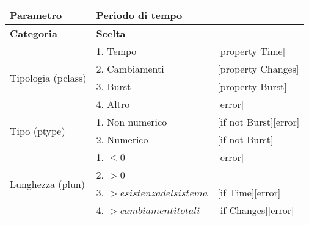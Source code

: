 \begin{table}[ht]
\begin{tabular}{|p{4cm}|p{4cm}p{5cm}|}
				
				\cellcolor{Gray} \textbf{Parametro}		& Periodo di tempo			&									\tabularnewline
				\hline
				\rowcolor{Gray}
				\textbf{Categoria} 						& \textbf{Scelta}			&									\tabularnewline
				\hline
				\multirow{4}{*}{Tipologia (pclass)} 	& 1. Tempo 					&	[property Time]				 	\tabularnewline
				\cline{2-3}
														& 2. Cambiamenti			&	[property Changes]				\tabularnewline
				\cline{2-3}
														& 3. Burst 					&	[property Burst]				\tabularnewline
				\cline{2-3}
														& 4. Altro 					&	[error]							\tabularnewline
				\hline
				\multirow{2}{*}{Tipo (ptype)} 			& 1. Non numerico 			&	[if not Burst][error]		 	\tabularnewline
				\cline{2-3}
														& 2. Numerico 				&	[if not Burst]					\tabularnewline
				\hline
				\multirow{4}{*}{Lunghezza (plun)} 		& 1. $\leq 0$					&	[error] 					\tabularnewline
				\cline{2-3}
														& 2. $> 0$						&								\tabularnewline
				\cline{2-3}
														& 3. $> esistenza del sistema$ 	& 	[if Time][error]			\tabularnewline
				\cline{2-3}
														& 4. $> cambiamenti totali$		&	[if Changes][error]			\tabularnewline
				\hline
			\end{tabular}
		\end {table}

\clearpage

